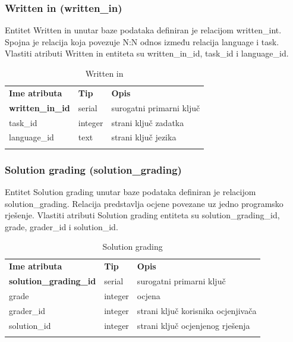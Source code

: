 \documentclass[times, utf8, zavrsni]{fer}
\begin{document}
		\subsubsection{Written in (written\_in)}
		Entitet Written in unutar baze podataka definiran je relacijom written\_int. Spojna je relacija koja povezuje N:N odnos između relacija language i task. Vlastiti atributi Written in entiteta su written\_in\_id, task\_id i language\_id. 
		\begin{table}[H]
			\caption{Written in}
			\label{tbl:writtenin}
			\centering
			\begin{tabu} to \textwidth {XXX}
				\tabucline[1.75pt]{-}
				\textbf{Ime atributa} & \textbf{Tip} & \textbf{Opis}\\ 				
				\tabucline[1pt]{-}
				\textbf{written\_in\_id} & serial & surogatni primarni ključ\\ \hline
				task\_id & integer & strani ključ zadatka\\ \hline
				language\_id & text & strani ključ jezika\\ \hline
				\tabucline[1.75pt]{-}
			\end{tabu}
		\end{table}
		
		\subsubsection{Solution grading (solution\_grading)}
		Entitet Solution grading unutar baze podataka definiran je relacijom solution\_grading. Relacija predstavlja ocjene povezane uz jedno programsko rješenje. Vlastiti atributi Solution grading entiteta su solution\_grading\_id, grade, grader\_id i solution\_id. 
		\begin{table}[H]
			\caption{Solution grading}
			\label{tbl:solutiongrading}
			\centering
			\begin{tabu} to \textwidth {XXX}
				\tabucline[1.75pt]{-}
				\textbf{Ime atributa} & \textbf{Tip} & \textbf{Opis}\\ 				
				\tabucline[1pt]{-}
				\textbf{solution\_grading\_id} & serial & surogatni primarni ključ\\ \hline
				grade & integer & ocjena\\ \hline
				grader\_id & integer & strani ključ korisnika ocjenjivača\\ \hline
				solution\_id & integer & strani ključ ocjenjenog rješenja\\ \hline
				\tabucline[1.75pt]{-}
			\end{tabu}
		\end{table}
	
\end{document}
